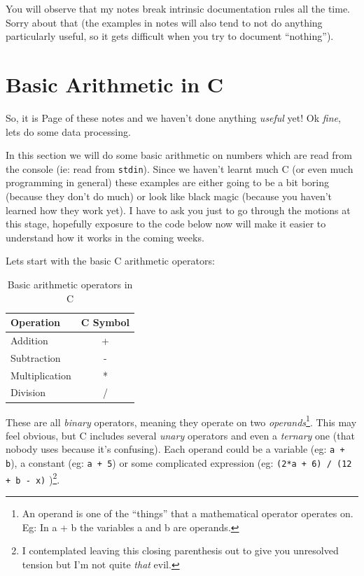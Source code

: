 \documentclass{lab}
\begin{document}
You will observe that my notes break intrinsic documentation rules all the time. Sorry about that (the examples in notes will also tend to not do anything particularly useful, so it gets difficult when you try to document ``nothing'').

\pagebreak
\section{Basic Arithmetic in C}

So, it is Page \thepage{} of these notes and we haven't done anything \textit{useful} yet! Ok \textit{fine}, lets do some data processing.

In this section we will do some basic arithmetic on numbers which are read from the console (ie: read from \texttt{stdin}). Since we haven't learnt much C (or even much programming in general) these examples are either going to be a bit boring (because they don't do much) or look like black magic (because you haven't learned how they work yet). I have to ask you just to go through the motions at this stage, hopefully exposure to the code below now will make it easier to understand how it works in the coming weeks.

Lets start with the basic C arithmetic operators:

\begin{table}[H]
\centering
\begin{tabular}{|l|c|}
\hline
Operation      & C Symbol \\
\hline
Addition       & +        \\
Subtraction    & -        \\
Multiplication & *        \\
Division       & /       \\
\hline
\end{tabular}
\caption{Basic arithmetic operators in C}
\end{table}

These are all \textit{binary} operators, meaning they operate on two \textit{operands}\footnote{An operand is one of the ``things'' that a mathematical operator operates on. Eg: In a + b the variables a and b are operands.}. This may feel obvious, but C includes several \textit{unary} operators and even a \textit{ternary} one (that nobody uses because it's confusing). Each operand could be a variable (eg: \texttt{a + b}), a constant (eg: \texttt{a + 5}) or some complicated expression (eg: \texttt{(2*a + 6) / (12 + b - x)} )\footnote{I contemplated leaving this closing parenthesis out to give you unresolved tension but I'm not quite \textit{that} evil.}.
\end{document}
